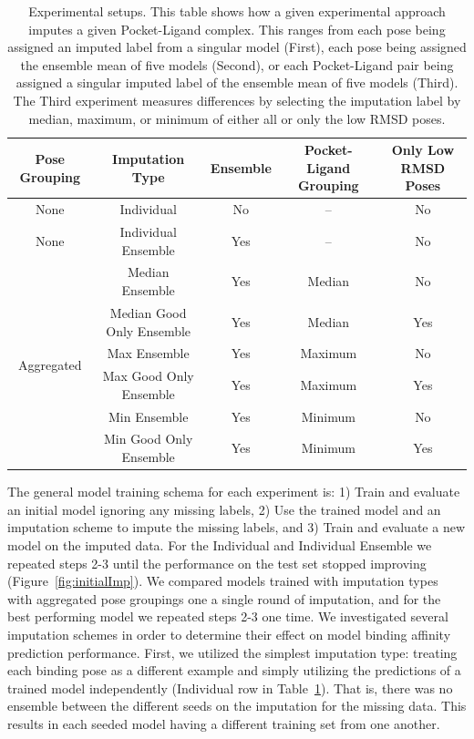 \documentclass[journal=jcim,manuscript=article]{achemso}
\begin{document}
\begin{table}
    \centering
    \begin{tabular}{c|c|c|c|c}
         Pose Grouping & Imputation Type & Ensemble & Pocket-Ligand Grouping & Only Low RMSD Poses \\
         \hline
        None & Individual & No & -- & No \\
        \hline
        None & Individual Ensemble & Yes & -- & No \\
         \hline
         \multirow{6}{*}{Aggregated} & Median Ensemble &  Yes & Median & No \\
          & Median Good Only Ensemble & Yes & Median & Yes \\
          & Max Ensemble & Yes & Maximum & No \\
          & Max Good Only Ensemble & Yes & Maximum & Yes \\
          & Min Ensemble & Yes & Minimum & No \\
          & Min Good Only Ensemble & Yes & Minimum & Yes \\
    \end{tabular}
    \caption{Experimental setups. This table shows how a given experimental approach imputes a given Pocket-Ligand complex. This ranges from each pose being assigned an imputed label from a singular model (First), each pose being assigned the ensemble mean of five models (Second), or each Pocket-Ligand pair being assigned a singular imputed label of the ensemble mean of five models (Third). The Third experiment measures differences by selecting the imputation label by median, maximum, or minimum of either all or only the low RMSD poses.}
    \label{tab:expApproach}
\end{table}

The general model training schema for each experiment is: 1) Train and evaluate an initial model ignoring any missing labels, 2) Use the trained model and an imputation scheme to impute the missing labels, and 3) Train and evaluate a new model on the imputed data. For the Individual and Individual Ensemble we repeated steps 2-3 until the performance on the test set stopped improving (Figure~\ref{fig:initialImp}).
We compared models trained with imputation types with aggregated pose groupings one a single round of imputation, and for the best performing model we repeated steps 2-3 one time.
We investigated several imputation schemes in order to determine their effect on model binding affinity prediction performance.
First, we utilized the simplest imputation type: treating each binding pose as a different example and simply utilizing the predictions of a trained model independently (Individual row in Table~\ref{tab:expApproach}).
That is, there was no ensemble between the different seeds on the imputation for the missing data.
This results in each seeded model having a different training set from one another.
\end{document}
